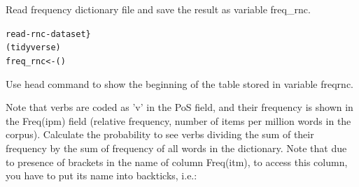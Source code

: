 \begin{ExerciseList}
	
	
	Read frequency dictionary file and save the result as variable freq\_rnc.	
\begin{knitrout}
\color{fgcolor}\begin{kframe}
\begin{alltt}
 read-rnc-dataset\}
	(tidyverse)
	freq_rnc <- ()
\end{alltt}


{\ttfamily\noindent\bfseries{}}\end{kframe}
\end{knitrout}
	\Question Use head command to show the beginning of the table stored in variable freqrnc.
	
\begin{knitrout}
\color{fgcolor}\begin{kframe}
\begin{alltt}
\end{alltt}


{\ttfamily\noindent\bfseries\color{errorcolor}{\#\# Error in head(freq\_rnc): oggetto 'freq\_rnc' non trovato}}\end{kframe}
\end{knitrout}
	\Question Note that verbs are coded as 'v' in the PoS field, and their frequency is shown in the Freq(ipm) field (relative frequency, number of items per million words in the corpus).	
	Calculate the probability to see verbs dividing the sum of their frequency by the sum of frequency of all words in the dictionary. Note that due to presence of brackets in the name of column Freq(itm), to access this column, you have to put its name into backticks, i.e.:
\begin{knitrout}
\color{fgcolor}\begin{kframe}
\begin{alltt}
         \hlkwb{<-} \hlopt{$} 
\end{alltt}



\end{kframe}
\end{knitrout}
\end{ExerciseList}
